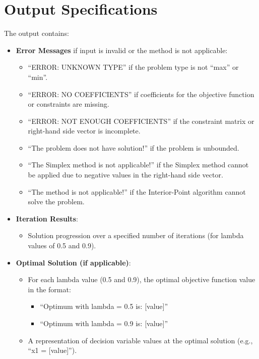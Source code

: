 \documentclass[12pt, legalpaper]{exam}
\begin{document}
\section*{Output Specifications}

The output contains:
\begin{itemize}
    \item \textbf{Error Messages} if input is invalid or the method is not applicable:
    \begin{itemize}
        \item ``ERROR: UNKNOWN TYPE'' if the problem type is not ``max'' or ``min''.
        \item ``ERROR: NO COEFFICIENTS'' if coefficients for the objective function or constraints are missing.
        \item ``ERROR: NOT ENOUGH COEFFICIENTS'' if the constraint matrix or right-hand side vector is incomplete.
        \item ``The problem does not have solution!'' if the problem is unbounded.
        \item ``The Simplex method is not applicable!'' if the Simplex method cannot be applied due to negative values in the right-hand side vector.
        \item ``The method is not applicable!'' if the Interior-Point algorithm cannot solve the problem.
    \end{itemize}
    \item \textbf{Iteration Results}:
    \begin{itemize}
        \item Solution progression over a specified number of iterations (for lambda values of 0.5 and 0.9).
    \end{itemize}
    \item \textbf{Optimal Solution (if applicable)}:
    \begin{itemize}
        \item For each lambda value (0.5 and 0.9), the optimal objective function value in the format:
        \begin{itemize}
            \item ``Optimum with lambda = 0.5 is: [value]''
            \item ``Optimum with lambda = 0.9 is: [value]''
        \end{itemize}
        \item A representation of decision variable values at the optimal solution (e.g., ``x1 = [value]'').
    \end{itemize}
\end{itemize}
\end{document}
